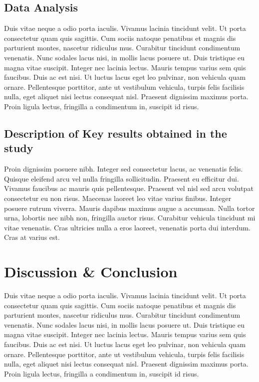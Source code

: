 \documentclass[12pt, a4paper,twoside]{tesi_upf}
\begin{document}
\section{Data Analysis}

Duis vitae neque a odio porta iaculis. Vivamus lacinia tincidunt velit. Ut porta consectetur quam quis sagittis. Cum sociis natoque penatibus et magnis dis parturient montes, nascetur ridiculus mus. Curabitur tincidunt condimentum venenatis. Nunc sodales lacus nisi, in mollis lacus posuere ut. Duis tristique eu magna vitae suscipit. Integer nec lacinia lectus. Mauris tempus varius sem quis faucibus. Duis ac est nisi. Ut luctus lacus eget leo pulvinar, non vehicula quam ornare. Pellentesque porttitor, ante ut vestibulum vehicula, turpis felis facilisis nulla, eget aliquet nisi lectus consequat nisl. Praesent dignissim maximus porta. Proin ligula lectus, fringilla a condimentum in, suscipit id risus.

\section{Description of Key results obtained in the study}

Proin dignissim posuere nibh. Integer sed consectetur lacus, ac venenatis felis. Quisque eleifend arcu vel nulla fringilla sollicitudin. Praesent eu efficitur dui. Vivamus faucibus ac mauris quis pellentesque. Praesent vel nisl sed arcu volutpat consectetur eu non risus. Maecenas laoreet leo vitae varius finibus. Integer posuere rutrum viverra. Mauris dapibus maximus augue a accumsan. Nulla tortor urna, lobortis nec nibh non, fringilla auctor risus. Curabitur vehicula tincidunt mi vitae venenatis. Cras ultricies nulla a eros laoreet, venenatis porta dui interdum. Cras at varius est.

\chapter{Discussion \& Conclusion}

Duis vitae neque a odio porta iaculis. Vivamus lacinia tincidunt velit. Ut porta consectetur quam quis sagittis. Cum sociis natoque penatibus et magnis dis parturient montes, nascetur ridiculus mus. Curabitur tincidunt condimentum venenatis. Nunc sodales lacus nisi, in mollis lacus posuere ut. Duis tristique eu magna vitae suscipit. Integer nec lacinia lectus. Mauris tempus varius sem quis faucibus. Duis ac est nisi. Ut luctus lacus eget leo pulvinar, non vehicula quam ornare. Pellentesque porttitor, ante ut vestibulum vehicula, turpis felis facilisis nulla, eget aliquet nisi lectus consequat nisl. Praesent dignissim maximus porta. Proin ligula lectus, fringilla a condimentum in, suscipit id risus.
\end{document}
